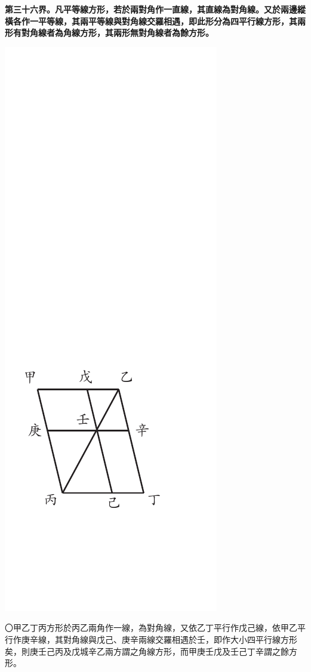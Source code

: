 \documentclass[12pt,b5paper,landscape]{article}
\newcommand{\bcom}[1]{〇#1}
\newcommand{\cthm}[1]{{
\vspace{8pt}

\bfseries #1}}
\begin{document}
\begin{multicols}{2}
\cthm{第三十六界。凡平等線方形，若於兩對角作一直線，其直線為對角線。又於兩邊縱橫各作一平等線，其兩平等線與對角線交羅相遇，即此形分為四平行線方形，其兩形有對角線者為角線方形，其兩形無對角線者為餘方形。}
\begin{center}
\includegraphics[angle=90]{eu25}
\end{center}
\bcom{甲乙丁丙方形於丙乙兩角作一線，為對角線，又依乙丁平行作戊己線，依甲乙平行作庚辛線，其對角線與戊己、庚辛兩線交羅相遇於壬，即作大小四平行線方形矣，則庚壬己丙及戊城辛乙兩方謂之角線方形，而甲庚壬戊及壬己丁辛謂之餘方形。}


\end{multicols}
\end{document}
